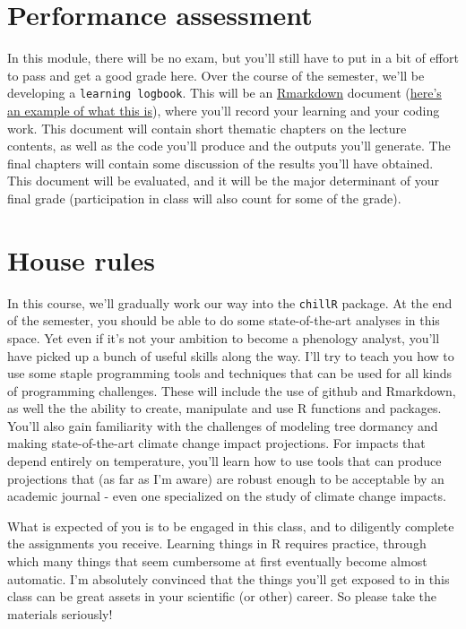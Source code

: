 \documentclass[
]{book}
\begin{document}
\hypertarget{performance-assessment}{%
\section{Performance assessment}\label{performance-assessment}}

In this module, there will be no exam, but you'll still have to put in a bit of effort to pass and get a good grade here. Over the course of the semester, we'll be developing a \texttt{learning\ logbook}. This will be an \href{https://rmarkdown.rstudio.com/}{Rmarkdown} document (\href{https://static-content.springer.com/esm/art\%3A10.1007\%2Fs10584-020-02862-8/MediaObjects/10584_2020_2862_MOESM1_ESM.pdf}{here's an example of what this is}), where you'll record your learning and your coding work. This document will contain short thematic chapters on the lecture contents, as well as the code you'll produce and the outputs you'll generate. The final chapters will contain some discussion of the results you'll have obtained. This document will be evaluated, and it will be the major determinant of your final grade (participation in class will also count for some of the grade).

\hypertarget{house-rules}{%
\section{House rules}\label{house-rules}}

In this course, we'll gradually work our way into the \texttt{chillR} package. At the end of the semester, you should be able to do some state-of-the-art analyses in this space. Yet even if it's not your ambition to become a phenology analyst, you'll have picked up a bunch of useful skills along the way. I'll try to teach you how to use some staple programming tools and techniques that can be used for all kinds of programming challenges. These will include the use of github and Rmarkdown, as well the the ability to create, manipulate and use R functions and packages. You'll also gain familiarity with the challenges of modeling tree dormancy and making state-of-the-art climate change impact projections. For impacts that depend entirely on temperature, you'll learn how to use tools that can produce projections that (as far as I'm aware) are robust enough to be acceptable by an academic journal - even one specialized on the study of climate change impacts.

What is expected of you is to be engaged in this class, and to diligently complete the assignments you receive. Learning things in R requires practice, through which many things that seem cumbersome at first eventually become almost automatic. I'm absolutely convinced that the things you'll get exposed to in this class can be great assets in your scientific (or other) career. So please take the materials seriously!
\end{document}
